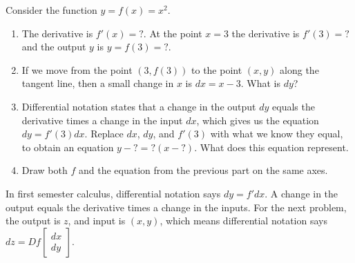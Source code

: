 \begin{problem}
 Consider the function $y=f(x)=x^2$.  
\begin{enumerate}
 \item The derivative is $f'(x) = ?$. At the point $x=3$ the derivative is $f'(3)=?$ and the output $y$ is $y=f(3)=?$.
 \item If we move from the point $(3,f(3))$ to the point $(x,y)$ along the tangent line, then a small change in $x$ is $dx=x-3$. What is $dy$?
 \item Differential notation states that a change in the output $dy$ equals the derivative times a change in the input $dx$, which gives us the equation $dy=f'(3)dx$. Replace $dx$, $dy$, and $f'(3)$ with what we know they equal, to obtain an equation $y-?=?(x-?)$. What does this equation represent.
 \item Draw both $f$ and the equation from the previous part on the same axes.   
\end{enumerate}
\end{problem}

 In first semester calculus, differential notation says $dy=f' dx$. A change in the output equals the derivative times a change in the inputs.  For the next problem, the output is $z$, and input is $(x,y)$, which means differential notation says $dz = Df \begin{bmatrix}dx\\dy\end{bmatrix}$.  

